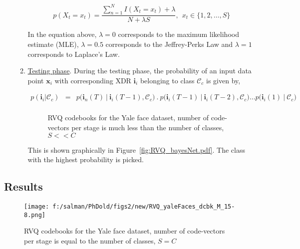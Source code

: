 \begin{Body}
\begin{enumerate}
\begin{enumerate}
\begin{equation}
p(X_t=x_t) = \frac{\sum\limits_{n=1}^{N}I(X_t=x_t)+\lambda}{N+\lambda S}, \ \ x_t \in \{1, 2, \dots, S\}
\end{equation}
  
In the equation above, $\lambda=0$ corresponds to the maximum likelihood estimate (MLE), $\lambda=0.5$ corresponds to the Jeffrey-Perks Law and $\lambda=1$ corresponds to Laplace's Law.
\item \underline{Testing phase}.  During the testing phase, the probability of an input data point $\mathbf{x}_i$ with corresponding XDR $\mathbf{i}_i$ belonging to class $\mathcal{C}_c$ is given by,

\begin{equation}
\begin{array}{llllll}
p (\mathbf{i}_i|\mathcal{C}_c) &=& p \bigg (\mathbf{i}_n(T) \ | \ \mathbf{i}_i(T-1), \mathcal{C}_c \bigg) \ . \ 
p \bigg(\mathbf{i}_i(T-1) \ | \ \mathbf{i}_i(T-2), \mathcal{C}_c \bigg) \ldots  
p \bigg (\mathbf{i}_i(1) \ | \ \mathcal{C}_c \bigg ) \\
\end{array}
\end{equation}
									\begin{figure}[t]
									\centering
									\caption{RVQ codebooks for the Yale face dataset, number of code-vectors per stage is much less than the number of classes, $S << C$}
									\label{fig:RVQ_codebooks_smallS_Yale}	
									\end{figure}



This is shown graphically in Figure~\ref{fig:RVQ_bayesNet.pdf}.  The class with the highest probability is picked.
\end{enumerate}
\end{enumerate}

\subsection{Results}
									\begin{figure}[t]
									\centering
									\texttt{[image: f:/salman/PhDold/figs2/new/RVQ\_yaleFaces\_dcbk\_M\_15-8.png]}
									\caption{RVQ codebooks for the Yale face dataset, number of code-vectors per stage is equal to the number of classes, $S=C$}
									\label{fig:RVQ_codebooks_largeS_Yale}	
									\end{figure}


\end{Body}
